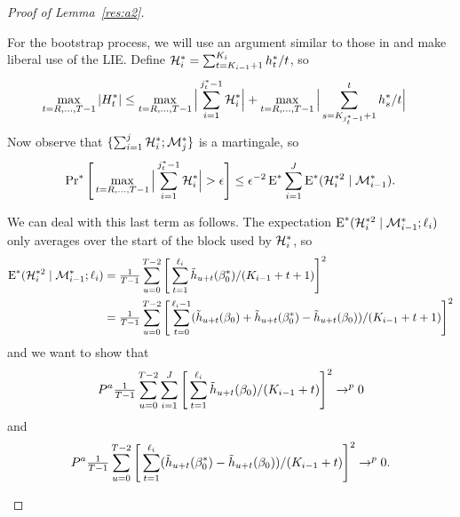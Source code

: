 \documentclass[12pt,fleqn]{article}
\begin{document}
\begin{proof}[Proof of Lemma~\ref{res:a2}]
\begin{enumerate}
    For the bootstrap process, we will use an argument similar to
    those in \cite{Cal:14} and make liberal use of the
    LIE. Define $\mathcal{H}_i^* = \sum_{t=K_{i-1}+1}^{K_i}
    h_t^*/t$, so
    \begin{align*}
      \max_{t=R,\dots,T-1} | H_t^* |
      &\leq \max_{t=R,\dots,T-1} \Big| \sum_{i=1}^{j^*_t - 1}\mathcal{H}_i^* \Big| + \max_{t=R,\dots,T-1} \Big|\sum_{s=K_{j^*_t - 1}+1}^t h_s^*/t \Big|
    \end{align*}
    Now observe that $\{\sum_{i=1}^j \mathcal{H}_i^*; \mathcal{M}_j^*\}$ is a martingale, so
    \begin{equation*}
      \operatorname{Pr}^*\Bigg[ \max_{t=R,\dots,T-1} \Big| \sum_{i=1}^{j^*_t - 1}\mathcal{H}_i^* \Big| > \epsilon \Bigg]
      \leq \epsilon^{-2} \operatorname{E}^* \sum_{i=1}^J \operatorname{E}^*(\mathcal{H}_i^{*2} \mid \mathcal{M}_{i-1}^*).
    \end{equation*}

    We can deal with this last term as follows. The expectation
    $\operatorname{E}^*(\mathcal{H}_i^{*2} \mid \mathcal{M}_{i-1}^*; \ell_i)$ only averages over the
    start of the block used by $\mathcal{H}_i^*$, so
    \begin{align*}
      \operatorname{E}^*(\mathcal{H}_i^{*2} \mid \mathcal{M}_{i-1}^*; \ell_i)
      &= \tfrac{1}{T-1} \sum_{u = 0}^{T-2} \Bigg[\sum_{t = 1}^{\ell_{i}} \tilde{h}_{u + t}(\beta_0^*) / (K_{i-1} + t + 1)\Bigg]^2 \\
      &= \tfrac{1}{T-1} \sum_{u = 0}^{T-2} \Bigg[\sum_{t = 0}^{\ell_{i}-1}
      (\tilde{h}_{u + t}(\beta_0) + \tilde{h}_{u + t}(\beta_0^*) - \tilde{h}_{u + t}(\beta_0))/ (K_{i-1} + t + 1)\Bigg]^2
    \end{align*}
    and we want to show that
    \begin{equation}\label{eq:4}
      P^a \tfrac{1}{T-1} \sum_{u = 0}^{T-2} \sum_{i=1}^J \Bigg[\sum_{t = 1}^{\ell_{i}}
      \tilde{h}_{u + t}(\beta_0)/ (K_{i-1} + t)\Bigg]^2 \to^p 0
    \end{equation}
    and
    \begin{equation}\label{eq:5}
      P^a \tfrac{1}{T-1} \sum_{u = 0}^{T-2} \Bigg[\sum_{t = 1}^{\ell_{i}}
      (\tilde{h}_{u + t}(\beta_0^*) - \tilde{h}_{u + t}(\beta_0))/ (K_{i-1} + t)\Bigg]^2
      \to^p 0.
    \end{equation}


\end{enumerate}
\end{proof}
\end{document}
